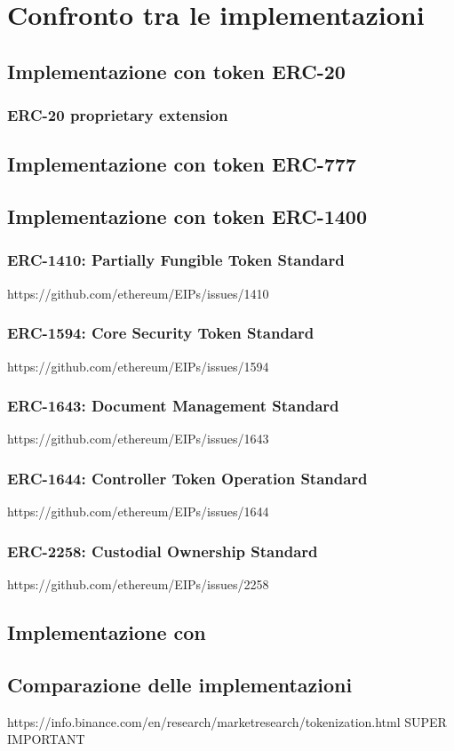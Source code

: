 \chapter{Confronto tra le implementazioni}
\section{Implementazione con token ERC-20}
\subsection{ERC-20 proprietary extension}
\section{Implementazione con token ERC-777}
\section{Implementazione con token ERC-1400}
\subsection{ERC-1410: Partially Fungible Token Standard}
https://github.com/ethereum/EIPs/issues/1410
\subsection{ERC-1594: Core Security Token Standard}
https://github.com/ethereum/EIPs/issues/1594
\subsection{ERC-1643: Document Management Standard}
https://github.com/ethereum/EIPs/issues/1643
\subsection{ERC-1644: Controller Token Operation Standard}
https://github.com/ethereum/EIPs/issues/1644
\subsection{ERC-2258: Custodial Ownership Standard}
https://github.com/ethereum/EIPs/issues/2258
\section{Implementazione con }
\section{Comparazione delle implementazioni}

https://info.binance.com/en/research/marketresearch/tokenization.html SUPER IMPORTANT